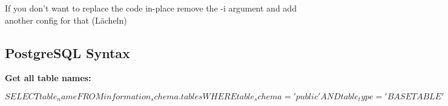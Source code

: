 


If you don't want to replace the code in-place remove the -i argument and add another config for that (Lächeln)



\subsection{PostgreSQL Syntax}

\textbf{Get all table names:}

$
SELECT table_name
FROM information_schema.tables
WHERE table_schema='public' AND table_type='BASE TABLE'
$

